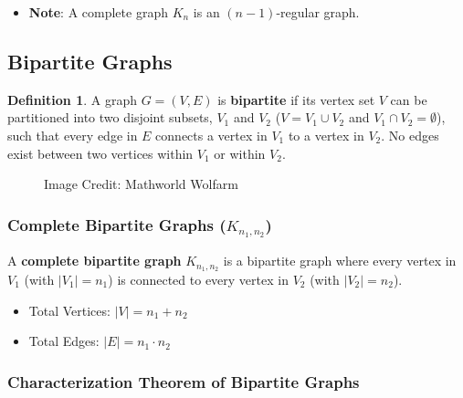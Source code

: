 \documentclass[
]{book}
\makeatletter
\newcommand*\pandocbounded[1]{%
  \sbox\pandoc@box{#1}%
  \Gscale@div\@tempa{\textheight}{\dimexpr\ht\pandoc@box+\dp\pandoc@box\relax}%
  \Gscale@div\@tempb{\linewidth}{\wd\pandoc@box}%
  \ifdim\@tempb\p@<\@tempa\p@\let\@tempa\@tempb\fi%
  \ifdim\@tempa\p@<\p@\scalebox{\@tempa}{\usebox\pandoc@box}%
  \else\usebox{\pandoc@box}%
  \fi%
}
\providecommand{\tightlist}{%
  \setlength{\itemsep}{0pt}\setlength{\parskip}{0pt}}
\theoremstyle{definition}
\newtheorem{definition}{Definition}[chapter]
\theoremstyle{definition}
\theoremstyle{definition}
\theoremstyle{definition}
\theoremstyle{remark}
\makeatother
\begin{document}
\begin{itemize}
\tightlist
\item
  \textbf{Note}: A complete graph \(K_n\) is an \((n - 1)\)-regular graph.
\end{itemize}

\subsection{Bipartite Graphs}\label{bipartite-graphs}

\begin{definition}
\protect\hypertarget{def:unnamed-chunk-9}{}\label{def:unnamed-chunk-9}A graph \(G = (V, E)\) is \textbf{bipartite} if its vertex set \(V\) can be partitioned into two disjoint subsets, \(V_1\) and \(V_2\) (\(V = V_1 \cup V_2\) and \(V_1 \cap V_2 = \emptyset\)), such that every edge in \(E\) connects a vertex in \(V_1\) to a vertex in \(V_2\). No edges exist between two vertices within \(V_1\) or within \(V_2\).
\end{definition}

\begin{figure}
\centering
\pandocbounded{}
\caption{Image Credit: Mathworld Wolfarm}
\end{figure}

\subsubsection{\texorpdfstring{Complete Bipartite Graphs (\(K_{n_1, n_2}\))}{Complete Bipartite Graphs (K\_\{n\_1, n\_2\})}}\label{complete-bipartite-graphs-k_n_1-n_2}

A \textbf{complete bipartite graph} \(K_{n_1, n_2}\) is a bipartite graph where every vertex in \(V_1\) (with \(\vert{}V_1\vert{} = n_1\)) is connected to every vertex in \(V_2\) (with \(\vert{}V_2\vert{} = n_2\)).

\begin{itemize}
\tightlist
\item
  Total Vertices: \(\vert{}V\vert{} = n_1 + n_2\)
\item
  Total Edges: \(\vert{}E\vert{} = n_1 \cdot n_2\)
\end{itemize}

\subsubsection{Characterization Theorem of Bipartite Graphs}\label{characterization-theorem-of-bipartite-graphs}
\end{document}
